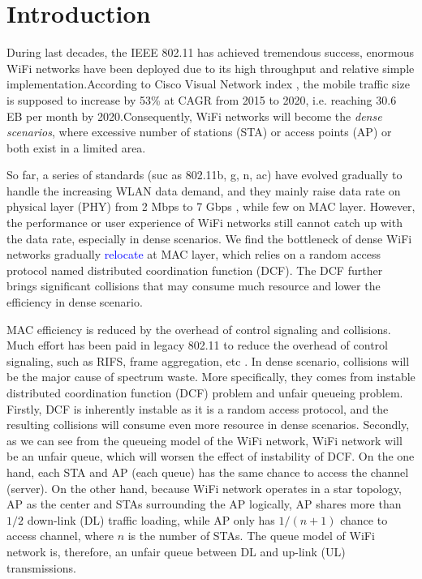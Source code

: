 \documentclass[journal]{IEEEtran}
\begin{document}
\section{Introduction}		\label{Intro}

During last decades, the IEEE 802.11 has achieved tremendous success, enormous WiFi networks have been deployed due to its high throughput and relative simple implementation.According to Cisco Visual Network index \cite{cisco2016}, the mobile traffic size is supposed to increase by 53\% at CAGR from 2015 to 2020, i.e. reaching 30.6 EB per month by 2020.Consequently, WiFi networks will become the \textit{dense scenarios}, where excessive number of stations (STA) or access points (AP) or both exist in a limited area. 

So far, a series of standards (suc as 802.11b, g, n, ac) have evolved gradually to handle the increasing WLAN data demand, and they mainly raise data rate on physical layer (PHY) from 2 Mbps to 7 Gbps \cite{perahia2013next}, while few on MAC layer.
However, the performance or user experience of WiFi networks still cannot catch up with the data rate, especially in dense scenarios. We find the bottleneck of dense WiFi networks gradually \textcolor{blue}{relocate} at MAC layer, which relies on a random access protocol named distributed coordination function (DCF). The DCF further brings significant collisions that may consume much resource and lower the efficiency in dense scenario.

MAC efficiency is reduced by the overhead of control signaling and collisions. Much effort has been paid in legacy 802.11 to reduce the overhead of control signaling, such as RIFS, frame aggregation, etc \cite{perahia2013next}. 
In dense scenario, collisions will be the major cause of spectrum waste. More specifically, they comes from instable distributed coordination function (DCF) problem and unfair queueing problem. Firstly, DCF is inherently instable as it is a random access protocol, and the resulting collisions will consume even more resource in dense scenarios. Secondly, as we can see from the queueing model of the WiFi network, WiFi network will be an unfair queue, which will worsen the effect of instability of DCF. 
On the one hand, each STA and AP  (each queue) has the same chance to access the channel (server). 
On the other hand, because WiFi network operates in a star topology, AP as the center and STAs surrounding the AP logically, AP shares more than $1/2$ down-link (DL) traffic loading, while AP only has $1/(n+1)$ chance to access channel, where $n$ is the number of STAs.
The queue model of WiFi network is, therefore, an unfair queue between DL and up-link (UL) transmissions. 
\end{document}
